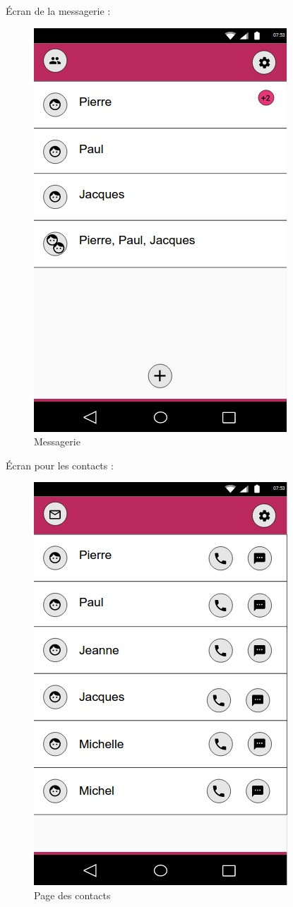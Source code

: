 	
Écran de la messagerie : 

	\begin{figure}[H]
		\centering \includegraphics[scale=0.5]{img/Messagerie.png}
		\caption{Messagerie}
	\end{figure}


Écran pour les contacts : 

	\begin{figure}[H]
		\centering \includegraphics[scale=0.5]{img/Contacts.png}
		\caption{Page des contacts}
	\end{figure}

